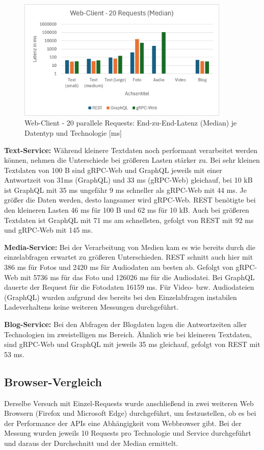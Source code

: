 \begin{figure}[htbp]
	\centering
	\includegraphics[width=0.9\textwidth]{images/Parallelrequests.png}
	\caption{Web-Client - 20 parallele Requests: End-zu-End-Latenz (Median) je Datentyp und Technologie [ms]}
	\label{fig:webclient-20req-median}
\end{figure}

\textbf{Text-Service:}  
Während kleinere Textdaten noch performant verarbeitet werden können, nehmen die Unterschiede bei größeren Lasten stärker zu. Bei sehr kleinen Textdaten von 100 B sind gRPC-Web und GraphQL jeweils mit einer Antwortzeit von 31ms (GraphQL) und 33 ms (gRPC-Web) gleichauf, bei 10 kB ist GraphQL mit 35 ms ungefähr 9 ms schneller als gRPC-Web mit 44 ms. Je größer die Daten werden, desto langsamer wird gRPC-Web. REST benötigte bei den kleineren Lasten 46 ms für 100 B und 62 ms für 10 kB. Auch bei größeren Textdaten ist GraphQL mit 71 ms am schnellsten, gefolgt von REST mit 92 ms und gRPC-Web mit 145 ms. 

\textbf{Media-Service:}  
Bei der Verarbeitung von Medien kam es wie bereits durch die einzelabfragen erwartet zu größeren Unterschieden. REST schnitt auch hier mit 386 ms für Fotos und 2420 ms für Audiodaten am besten ab. Gefolgt von gRPC-Web mit 5736 ms für das Foto und 126026 ms für die Audiodatei. Bei GraphQL dauerte der Request für die Fotodaten 16159 ms.
Für Video- bzw. Audiodateien (GraphQL) wurden aufgrund des bereits bei den Einzelabfragen instabilen Ladeverhaltens keine weiteren Messungen durchgeführt.


\textbf{Blog-Service:}  
Bei den Abfragen der Blogdaten lagen die Antwortzeiten aller Technologien im zweistelligen ms Bereich. Ähnlich wie bei kleineren Textdaten, sind gRPC-Web und GraphQL mit jeweils 35 ms gleichauf, gefolgt von REST mit 53 ms.

\clearpage
\subsection{Browser-Vergleich}
Derselbe Versuch mit Einzel-Requests wurde anschließend in zwei weiteren Web Browsern (Firefox und Microsoft Edge) durchgeführt, um festzustellen, ob es bei der Performance der APIs eine Abhängigkeit vom Webbrowser gibt. 
Bei der Messung wurden jeweils 10 Requests pro Technologie und Service durchgeführt und daraus der Durchschnitt und der Median ermittelt.

